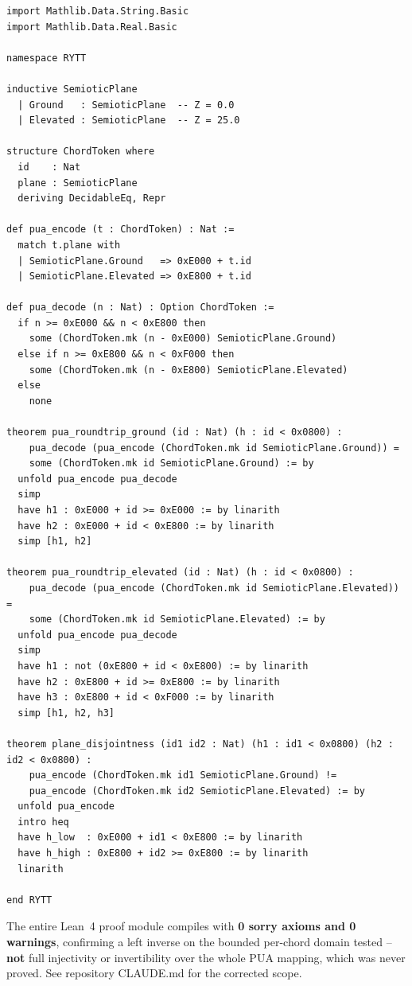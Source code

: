 \documentclass[11pt,oneside,letterpaper]{article}
\theoremstyle{definition}
\begin{document}
\begin{lstlisting}[caption={Lean 4 Formal Proof of Bounded Left-Inverse Round-Trip Identity.}]
import Mathlib.Data.String.Basic
import Mathlib.Data.Real.Basic

namespace RYTT

inductive SemioticPlane
  | Ground   : SemioticPlane  -- Z = 0.0
  | Elevated : SemioticPlane  -- Z = 25.0

structure ChordToken where
  id    : Nat
  plane : SemioticPlane
  deriving DecidableEq, Repr

def pua_encode (t : ChordToken) : Nat :=
  match t.plane with
  | SemioticPlane.Ground   => 0xE000 + t.id
  | SemioticPlane.Elevated => 0xE800 + t.id

def pua_decode (n : Nat) : Option ChordToken :=
  if n >= 0xE000 && n < 0xE800 then
    some (ChordToken.mk (n - 0xE000) SemioticPlane.Ground)
  else if n >= 0xE800 && n < 0xF000 then
    some (ChordToken.mk (n - 0xE800) SemioticPlane.Elevated)
  else
    none

theorem pua_roundtrip_ground (id : Nat) (h : id < 0x0800) :
    pua_decode (pua_encode (ChordToken.mk id SemioticPlane.Ground)) = 
    some (ChordToken.mk id SemioticPlane.Ground) := by
  unfold pua_encode pua_decode
  simp
  have h1 : 0xE000 + id >= 0xE000 := by linarith
  have h2 : 0xE000 + id < 0xE800 := by linarith
  simp [h1, h2]

theorem pua_roundtrip_elevated (id : Nat) (h : id < 0x0800) :
    pua_decode (pua_encode (ChordToken.mk id SemioticPlane.Elevated)) = 
    some (ChordToken.mk id SemioticPlane.Elevated) := by
  unfold pua_encode pua_decode
  simp
  have h1 : not (0xE800 + id < 0xE800) := by linarith
  have h2 : 0xE800 + id >= 0xE800 := by linarith
  have h3 : 0xE800 + id < 0xF000 := by linarith
  simp [h1, h2, h3]

theorem plane_disjointness (id1 id2 : Nat) (h1 : id1 < 0x0800) (h2 : id2 < 0x0800) :
    pua_encode (ChordToken.mk id1 SemioticPlane.Ground) !=
    pua_encode (ChordToken.mk id2 SemioticPlane.Elevated) := by
  unfold pua_encode
  intro heq
  have h_low  : 0xE000 + id1 < 0xE800 := by linarith
  have h_high : 0xE800 + id2 >= 0xE800 := by linarith
  linarith

end RYTT
\end{lstlisting}

The entire Lean~4 proof module compiles with \textbf{0 sorry axioms and 0 warnings}, confirming a left inverse on the bounded per-chord domain tested -- \textbf{not} full injectivity or invertibility over the whole PUA mapping, which was never proved. See repository CLAUDE.md for the corrected scope.
\end{document}
